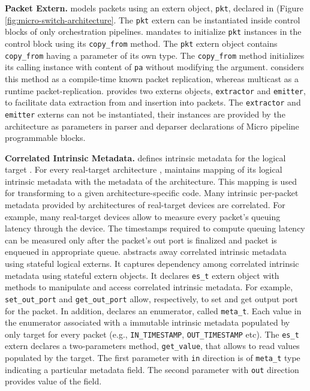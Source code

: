\documentclass[letterpaper,twocolumn,10pt]{article}
\begin{document}
\textbf{Packet Extern.}
\uarch models packets using an extern object, \texttt{pkt}, declared in \uarch (Figure \ref{fig:micro-switch-architecture}.
The \texttt{pkt} extern can be instantiated inside control blocks of only orchestration pipelines.
\ucomp mandates to initialize \texttt{pkt} instances in the control block using its \texttt{copy\_from} method.
The \texttt{pkt} extern object contains \texttt{copy\_from} having a parameter of its own type.
The \texttt{copy\_from} method initializes its calling instance with content of \texttt{pa} without modifying the argument.
\uswitch considers this method as a compile-time known packet replication, whereas multicast as a runtime packet-replication.
\uarch provides two externs objects, \texttt{extractor} and \texttt{emitter}, to facilitate data extraction from and insertion into packets.
The \texttt{extractor} and \texttt{emitter} externs can not be instantiated, their instances are provided by the architecture as parameters in parser and deparser declarations of Micro pipeline programmable blocks. 

\textbf{Correlated Intrinsic Metadata.}
\uarch defines intrinsic metadata for the logical target \uswitch.
For every real-target architecture , \ucomp maintains mapping of its logical intrinsic metadata with the metadata of the architecture.
This mapping is used for transforming \uprograms to a given architecture-specific code.
Many intrinsic per-packet metadata provided by architectures of real-target devices are correlated.
For example, many real-target devices allow to measure every packet's queuing latency through the device.
The timestamps required to compute queuing latency can be measured only after the packet's out port is finalized and packet is enqueued in appropriate queue.
\uarch abstracts away correlated intrinsic metadata using stateful logical externs.
It captures dependency among correlated intrinsic metadata using stateful extern objects.
It declares \texttt{es\_t} extern object with methods to manipulate and access correlated intrinsic metadata.
For example, \texttt{set\_out\_port} and \texttt{get\_out\_port} allow, respectively, to set and get output port for the packet.
In addition, \uarch declares an enumerator, called \texttt{meta\_t}.
Each value in the enumerator associated with a immutable intrinsic metadata populated by only target for every packet (e.g., \texttt{IN\_TIMESTAMP}, \texttt{OUT\_TIMESTAMP} etc).
The \texttt{es\_t} extern declares a two-parameters method, \texttt{get\_value}, that allows to read values populated by the target.
The first parameter with \texttt{in} direction is of \texttt{meta\_t} type indicating a particular metadata field.
The second parameter with \texttt{out} direction provides value of the field.
\end{document}
